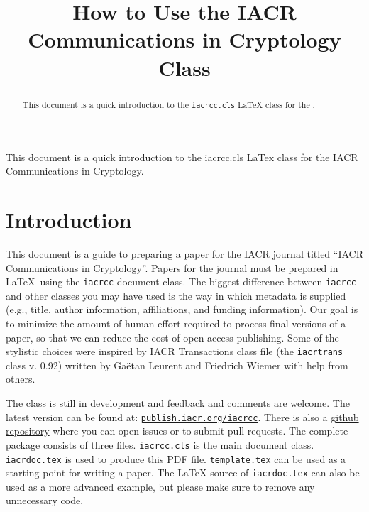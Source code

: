 \documentclass{iacrcc}
\title[running  = {The iacrcc class},
       subtitle = {iacrcc LaTeX Class Documentation (v0.74)}
      ]{How to Use the IACR Communications in Cryptology Class}
\begin{document}
\maketitle


\begin{abstract}
  This document is a quick introduction to the \texttt{iacrcc.cls}
  \LaTeX{} class for the \publname{}.
\end{abstract}

\begin{textabstract}
  This document is a quick introduction to the iacrcc.cls
  LaTex class for the IACR Communications in Cryptology.
\end{textabstract}

\section*{Introduction}

This document is a guide to preparing a paper for the IACR journal
titled ``IACR Communications in Cryptology''.  Papers for the journal
must be prepared in \LaTeX\ using the \texttt{iacrcc} document
class. The biggest difference between \texttt{iacrcc} and other
classes you may have used is the way in which metadata is supplied
(e.g., title, author information, affiliations, and funding
information). Our goal is to minimize the amount of human effort
required to process final versions of a paper, so that we can reduce
the cost of open access publishing.  Some of the stylistic choices
were inspired by IACR Transactions class file (the \texttt{iacrtrans}
class v. 0.92) written by Ga{\"e}tan Leurent and Friedrich Wiemer with
help from others.

The class is still in development and feedback and comments are
welcome.  The latest version can be found at:
\href{https://publish.iacr.org/iacrcc}{\texttt{publish.iacr.org/iacrcc}}.
There is also a \href{https://github.com/IACR/latex}{github
  repository} where you can open issues or to submit pull requests.
The complete package consists of three files. \texttt{iacrcc.cls} is
the main document class. \texttt{iacrdoc.tex} is used to produce this PDF
file. \texttt{template.tex} can be used as a starting point for
writing a paper.  The \LaTeX{} source of \texttt{iacrdoc.tex} can also
be used as a more advanced example, but please make sure to remove any
unnecessary code.
\end{document}
